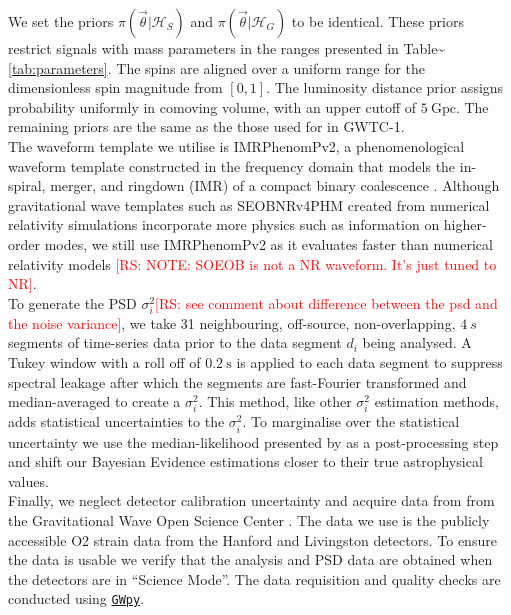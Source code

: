 \documentclass[%
preprint,
 amsmath,amssymb,
 aps,
]{revtex4}
\newcommand{\gwpy}{{\sc \href{https://gwpy.github.io/}{\texttt{GWpy}}}\xspace}
\newcommand{\imrphenomp}{{\sc IMRPhenomPv2}\xspace}
\newcommand{\seob}{{\sc SEOBNRv4PHM}\xspace}
\newcommand{\psd}{{\sc $\sigma^2_i$}\xspace}
\newcommand{\rs}[1]{\textcolor{red}{[RS: #1]}}
\begin{document}
We set the priors $\pi(\vec{\theta}|\mathcal{H}_S)$ and $\pi(\vec{\theta}|\mathcal{H}_G)$ to be identical. These priors restrict signals with mass parameters in the ranges presented in Table\textasciitilde\ref{tab:parameters}. The spins are aligned over a uniform range for the dimensionless spin magnitude from $\left[0,1\right]$. The luminosity distance prior assigns probability uniformly in comoving volume, with an upper cutoff of $5\ \text{Gpc}$. The remaining priors are the same as the those used for in GWTC-1. \\

The waveform template we utilise is \imrphenomp, a phenomenological waveform template constructed in the frequency domain that models the in-spiral, merger, and ringdown (IMR) of a compact binary coalescence \citep{khan2016frequency}. Although gravitational wave templates such as \seob \cite{seob} created from numerical relativity simulations incorporate more physics such as information on higher-order modes, we still use \imrphenomp as it evaluates faster than numerical relativity models \rs{NOTE: SOEOB is not a NR waveform. It's just tuned to NR}. \\

To generate the PSD \psd \rs{see comment about difference between the psd and the noise variance}, we take 31 neighbouring, off-source, non-overlapping,  $4\ s$  segments of time-series data prior to the data segment $d_i$ being analysed. A Tukey window with a roll off of $0.2\ \text{s}$ is applied to each data segment to suppress spectral leakage after which the segments are fast-Fourier transformed and median-averaged to create a \psd \cite{ligo_psd}. This method, like other \psd estimation methods, adds statistical uncertainties to the \psd \cite{psd_student_t}. To marginalise over the statistical uncertainty we use the median-likelihood presented by \citet{psd_student_t} as a post-processing step and shift our Bayesian Evidence estimations closer to their true astrophysical values. \\ 

Finally, we neglect detector calibration uncertainty and acquire data from from the Gravitational Wave Open Science Center \cite{GWOSC}. The data we use is the publicly accessible O2 strain data from the Hanford and Livingston detectors. To ensure the data is usable we verify that the analysis and PSD data are obtained when the detectors are  in ``Science Mode''. The data requisition and quality checks are conducted using \gwpy \cite{gwpy}. \\
\end{document}
